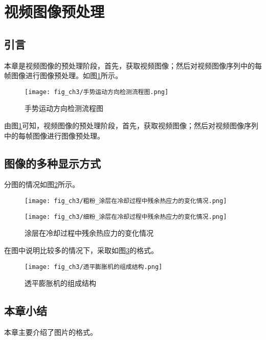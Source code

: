 
\section{视频图像预处理}

\subsection{引言}

本章是视频图像的预处理阶段，首先，获取视频图像；然后对视频图像序列中的每帧图像进行图像预处理。如图\ref{fig:手势运动方向检测流程图}所示。
\begin{figure}[H]
  \centering
  \texttt{[image: fig\_ch3/手势运动方向检测流程图.png]}
  \caption{手势运动方向检测流程图}
  \label{fig:手势运动方向检测流程图}
\end{figure}

由图\ref{fig:手势运动方向检测流程图}可知，视频图像的预处理阶段，首先，获取视频图像；然后对视频图像序列中的每帧图像进行图像预处理。

\subsection{图像的多种显示方式}

分图的情况如图\ref{fig:涂层在冷却过程中残余热应力的变化情况}所示。
\begin{figure}[H]
    \centering
    \begin{minipage}[c]{0.48\textwidth}
        \centering
        \texttt{[image: fig\_ch3/粗粉\_涂层在冷却过程中残余热应力的变化情况.png]}
    \end{minipage}
    \begin{minipage}[c]{0.48\textwidth}
        \centering
        \texttt{[image: fig\_ch3/细粉\_涂层在冷却过程中残余热应力的变化情况.png]}
    \end{minipage}
    \caption{涂层在冷却过程中残余热应力的变化情况}\label{fig:涂层在冷却过程中残余热应力的变化情况}
\end{figure}

在图中说明比较多的情况下，采取如图\ref{fig:透平膨胀机的组成结构}的格式。
\begin{figure}[H]
  \centering
  \texttt{[image: fig\_ch3/透平膨胀机的组成结构.png]}
  \caption{透平膨胀机的组成结构}
  \label{fig:透平膨胀机的组成结构}
\end{figure}

\subsection{本章小结}

本章主要介绍了图片的格式。

